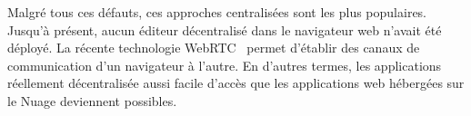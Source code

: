 Malgré tous ces défauts, ces approches centralisées sont les plus populaires.
Jusqu'à présent, aucun éditeur décentralisé dans le navigateur web n'avait été
déployé. La récente technologie WebRTC~\cite{webrtc} permet d'établir des canaux
de communication d'un navigateur à l'autre. En d'autres termes, les applications
réellement décentralisée aussi facile d'accès que les applications web hébergées
sur le Nuage deviennent possibles.


 



